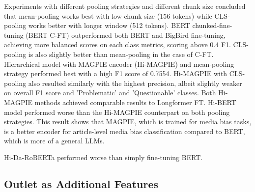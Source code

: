 Experiments with different pooling strategies and different chunk size concluded that mean-pooling works best with low chunk size (156 tokens) while CLS-pooling works better with longer window (512 tokens). BERT chunked-fine-tuning (BERT C-FT) outperformed both BERT and BigBird fine-tuning, achieving more balanced scores on each class metrics, scoring above 0.4 F1. CLS-pooling is also slightly better than mean-pooling in the case of C-FT. Hierarchical model with MAGPIE encoder (Hi-MAGPIE) and mean-pooling strategy performed best with a high F1 score of 0.7554. Hi-MAGPIE with CLS-pooling also resulted similarly with the highest precision, albeit slightly weaker on overall F1 score and 'Problematic' and 'Questionable' classes. Both Hi-MAGPIE methods achieved comparable results to Longformer FT. Hi-BERT model performed worse than the Hi-MAGPIE counterpart on both pooling strategies. This result shows that MAGPIE, which is trained for media bias tasks, is a better encoder for article-level media bias classification compared to BERT, which is more of a general LLMs.

Hi-Da-RoBERTa performed worse than simply fine-tuning BERT.

\subsection{Outlet as Additional Features}

